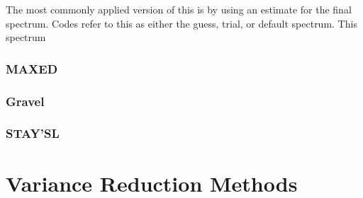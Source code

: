 


The most commonly applied version of this is by using an estimate for the final spectrum.
Codes refer to this as either the guess, trial, or default spectrum.
This spectrum 




\subsubsection{MAXED}





\subsubsection{Gravel}


\subsubsection{STAY'SL}




\section{Variance Reduction Methods}

